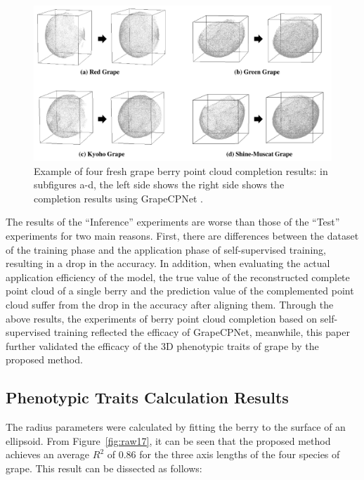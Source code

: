 \documentclass[12pt]{article}
\begin{document}
\begin{figure}[hbt!]
    \centering
    \includegraphics[width=1\textwidth]{figures/Figure13.pdf}
    \caption{Example of four fresh grape berry point cloud completion results: in subfigures a-d, the left side shows  the right side shows the completion results using  GrapeCPNet .}
    \label{fig:raw14}
\end{figure}

The results of the ``Inference'' experiments are worse than those of the ``Test'' experiments for two main reasons.
First, there are differences between the dataset of the training phase and the application phase of self-supervised training, resulting in a drop in the accuracy. 
In addition, when evaluating the actual application efficiency of the model, the true value of the reconstructed complete point cloud of a single berry and the prediction value of the complemented point cloud suffer from the drop in the accuracy after aligning them. 
Through the above results, the experiments of berry point cloud completion based on self-supervised training reflected the efficacy of GrapeCPNet, meanwhile, this paper further validated the efficacy of the 3D phenotypic traits of grape by the proposed method.

\subsection{Phenotypic Traits Calculation Results}

The radius parameters were calculated by fitting the berry to the surface of an ellipsoid.
From Figure~\ref{fig:raw17}, it can be seen that the proposed method achieves an average $R^2$ of 0.86  for the three axis lengths of the four species of grape. 
This result can be dissected as follows:
\end{document}
